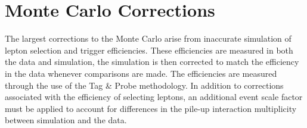 \section{Monte Carlo Corrections}
\label{sec:montecarlocorrections}
The largest corrections to the Monte Carlo arise from inaccurate simulation of lepton selection and trigger efficiencies.
These efficiencies are measured in both the data and simulation, the simulation is then corrected to match the efficiency in the data whenever comparisons are made.
The efficiencies are measured through the use of the Tag \& Probe methodology\cite{TAGANDPROBE}.
In addition to corrections associated with the efficiency of selecting leptons, an additional event scale factor must be applied to account for differences in the pile-up interaction multiplicity between simulation and the data.

